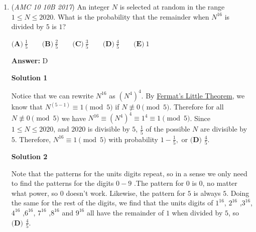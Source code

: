 \begin{enumerate}
 



\textbf{Solution 6 (Overcounting)}

When we add $10 + 13 + 9$, we get $32$. But here, every student who takes at least two classes was overcounted (included in the counts for both classes). We are given that this is $9$ students. And every student who takes all three classes was overcounted again, as they were not only included in the count for the two mentioned earlier, but also in the count for the third class. So, we get the equation $32 - 9 - x = 20$ (the actual amount of students). Solving, we get $x = \boxed{\textbf{(C) } 3}$.

 


	\item (\textit{AMC 10 10B 2017}) An integer $N$ is selected at random in the range $1\leq N \leq 2020$. What is the probability that the remainder when $N^{16}$ is divided by $5$ is $1$?


 $\textbf{(A)}\ \frac{1}{5}\qquad\textbf{(B)}\ \frac{2}{5}\qquad\textbf{(C)}\ \frac{3}{5}\qquad\textbf{(D)}\ \frac{4}{5}\qquad\textbf{(E)}\ 1$

 \textbf{Answer: }D



\textbf{Solution 1}

Notice that we can rewrite $N^{16}$ as $(N^{4})^4$. By \href{https://artofproblemsolving.com/wiki/index.php?title=Fermat\%27s\_Little\_Theorem}{Fermat's Little Theorem}, we know that $N^{(5-1)} \equiv 1 \pmod {5}$  if $N \not \equiv 0 \pmod {5}$. Therefore for all $N \not \equiv 0 \pmod {5}$ we have $N^{16} \equiv (N^{4})^4 \equiv 1^4 \equiv 1 \pmod 5$. Since  $1\leq N \leq 2020$, and $2020$ is divisible by $5$, $\frac{1}{5}$ of the possible $N$ are divisible by $5$. Therefore, $N^{16} \equiv 1 \pmod {5}$ with probability $1-\frac{1}{5},$ or $\boxed{\textbf{(D) } \frac 45}$.

 



\textbf{Solution 2}

Note that the patterns for the units digits repeat, so in a sense we only need to find the patterns for the digits $0-9$ .The pattern for $0$ is $0$, no matter what power, so $0$ doesn't work. Likewise, the pattern for $5$ is always $5$. Doing the same for the rest of the digits, we find that the units digits of $1^{16}$, $2^{16}$ ,$3^{16}$, $4^{16}$ ,$6^{16}$, $7^{16}$ ,$8^{16}$ and $9^{16}$ all have the remainder of $1$ when divided by $5$, so $\boxed{\textbf{(D) } \frac 45}$.


\end{enumerate}
